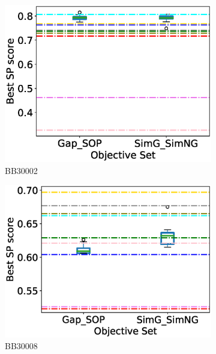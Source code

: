 \begin{figure}[!htbp]
\begin{adjustwidth}{-1cm}{-1cm}
\begin{subfigure}{0.22\textwidth}
			\includegraphics[width=\columnwidth]{Figure/summary/precomputedInit/Balibase/BB30002_objset_pairs_rank_2}
			\caption{BB30002}
		\end{subfigure}	
		\begin{subfigure}{0.22\textwidth}
			\includegraphics[width=\columnwidth]{Figure/summary/precomputedInit/Balibase/BB30008_objset_pairs_rank_2}
			\caption{BB30008}
		\end{subfigure}
		\begin{subfigure}{0.22\textwidth}

\end{subfigure}
\end{adjustwidth}
\end{figure}
